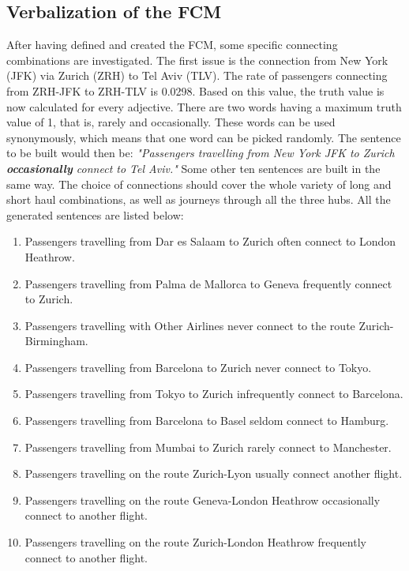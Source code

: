\documentclass[conference]{IEEEtran}
\begin{document}
\subsection{Verbalization of the FCM}
After having defined and created the FCM, some specific connecting combinations are investigated. The first issue is the connection from New York (JFK) via Zurich (ZRH) to Tel Aviv (TLV). The rate of passengers connecting from ZRH-JFK to ZRH-TLV is 0.0298. Based on this value, the truth value is now calculated for every adjective. There are two words having a maximum truth value of 1, that is, rarely and occasionally. These words can be used synonymously, which means that one word can be picked randomly. The sentence to be built would then be: \newline \emph{"Passengers travelling from New York JFK to Zurich \textbf{occasionally} connect to Tel Aviv."} \newline Some other ten sentences are built in the same way. The choice of connections should cover the whole variety of long and short haul combinations, as well as journeys through all the three hubs. All the generated sentences are listed below:
\begin{enumerate}
\item Passengers travelling from Dar es Salaam to Zurich often connect to London Heathrow.
\item Passengers travelling from Palma de Mallorca to Geneva frequently connect to Zurich.
\item Passengers travelling with Other Airlines never connect to the route Zurich-Birmingham.
\item Passengers travelling from Barcelona to Zurich never connect to Tokyo.
\item Passengers travelling from Tokyo to Zurich infrequently connect to Barcelona.
\item Passengers travelling from Barcelona to Basel seldom connect to Hamburg.
\item Passengers travelling from Mumbai to Zurich rarely connect to Manchester.
\item Passengers travelling on the route Zurich-Lyon usually connect another flight.
\item Passengers travelling on the route Geneva-London Heathrow occasionally connect to another flight.
\item Passengers travelling on the route Zurich-London Heathrow frequently connect to another flight.
\end{enumerate}
\end{document}
